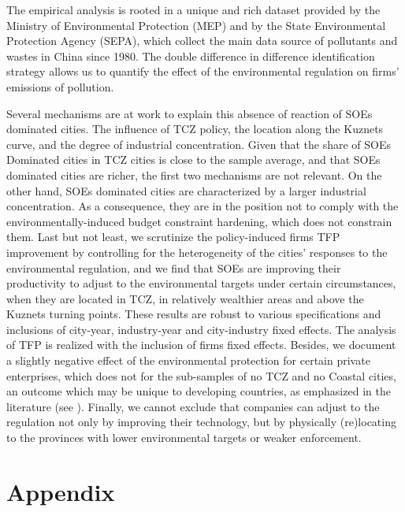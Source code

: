 \documentclass[12pt]{article}
\begin{document}
The empirical analysis is rooted in a unique and rich dataset provided by the Ministry of Environmental Protection (MEP) and by the State Environmental Protection Agency (SEPA), which collect the main data source of pollutants and wastes in China since 1980. The double difference in difference identification strategy allows us to quantify the effect of the environmental regulation on firms' emissions of pollution. 


Several mechanisms are at work to explain this absence of reaction of SOEs dominated cities. The influence of TCZ policy, the location along the Kuznets curve, and the degree of industrial concentration.  Given that the share of SOEs Dominated cities in TCZ cities is close to the sample average, and that SOEs dominated cities are richer, the first two mechanisms are not relevant.  On the other hand, SOEs dominated cities are characterized by a larger industrial concentration. As a consequence, they are in the position not to comply with the environmentally-induced budget constraint hardening, which does not constrain them. Last but not least, we scrutinize the policy-induced firms TFP improvement by controlling for the heterogeneity of the cities' responses to the environmental regulation, and we find that SOEs are improving their productivity to adjust to the environmental targets under certain circumstances, when they are located in TCZ, in relatively wealthier areas and above the Kuznets turning points. These results are robust to various specifications and inclusions of city-year, industry-year and city-industry fixed effects. The analysis of TFP is realized with the inclusion of firms fixed effects. Besides, we document a slightly negative effect of the environmental protection for certain private enterprises, which does not for the sub-samples of no TCZ and no Coastal cities, an outcome which may be unique to developing countries, as emphasized in the literature (see \cite{Jefferson2013-az}). Finally, we cannot exclude that companies can adjust to the regulation not only by improving their technology, but by physically (re)locating to the provinces with lower environmental targets or weaker enforcement.

\theendnotes



\section{Appendix} \label{appendix}
\end{document}
